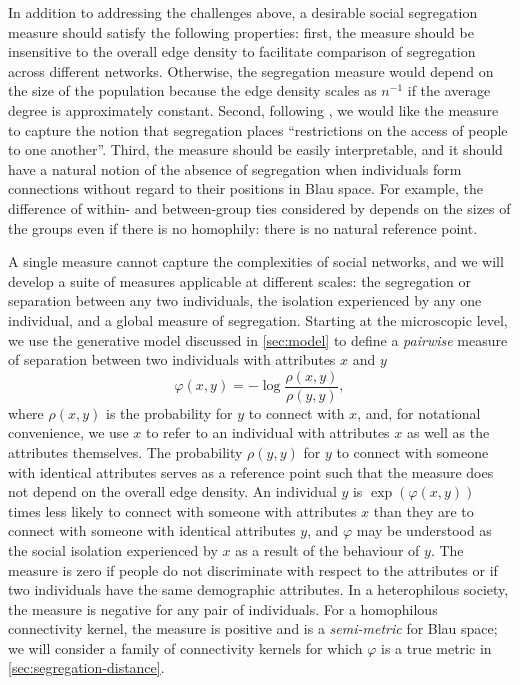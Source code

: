 \documentclass{scrartcl}
\begin{document}
In addition to addressing the challenges above, a desirable social segregation measure should satisfy the following properties: first, the measure should be insensitive to the overall edge density to facilitate comparison of segregation across different networks. Otherwise, the segregation measure would depend on the size of the population because the edge density scales as $n^{-1}$ if the average degree is approximately constant. Second, following \textcite{Freeman1978}, we would like the measure to capture the notion that segregation places ``restrictions on the access of people to one another''. Third, the measure should be easily interpretable, and it should have a natural notion of the absence of segregation when individuals form connections without regard to their positions in Blau space. For example, the difference of within- and between-group ties considered by \textcite{Krackhardt1988} depends on the sizes of the groups even if there is no homophily: there is no natural reference point.

A single measure cannot capture the complexities of social networks, and we will develop a suite of measures applicable at different scales: the segregation or separation between any two individuals, the isolation experienced by any one individual, and a global measure of segregation. Starting at the microscopic level, we use the generative model discussed in \cref{sec:model} to define a \emph{pairwise} measure of separation between two individuals with attributes $x$ and $y$
\begin{equation}
    \varphi(x, y) = -\log\frac{\rho(x, y)}{\rho(y, y)},\label{eq:segregation-pairwise}
\end{equation}
where $\rho(x, y)$ is the probability for $y$ to connect with $x$, and, for notational convenience, we use $x$ to refer to an individual with attributes $x$ as well as the attributes themselves. The probability $\rho(y, y)$ for $y$ to connect with someone with identical attributes serves as a reference point such that the measure does not depend on the overall edge density. An individual $y$ is $\exp(\varphi(x, y))$ times less likely to connect with someone with attributes $x$ than they are to connect with someone with identical attributes $y$, and $\varphi$ may be understood as the social isolation experienced by $x$ as a result of the behaviour of $y$. The measure is zero if people do not discriminate with respect to the attributes or if two individuals have the same demographic attributes. In a heterophilous society, the measure is negative for any pair of individuals. For a homophilous connectivity kernel, the measure is positive and is a \emph{semi-metric} for Blau space; we will consider a family of connectivity kernels for which $\varphi$ is a true metric in \cref{sec:segregation-distance}.
\end{document}
